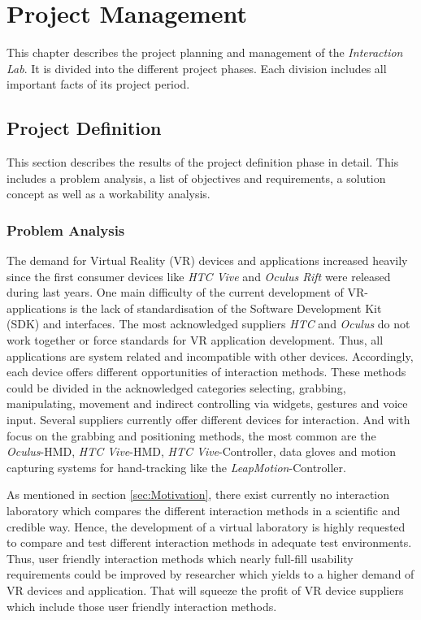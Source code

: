 \section{Project Management} \label{sec:pm}

This chapter describes the project planning and management of the \textit{Interaction Lab}. It is divided into the different project phases. Each division includes all important facts of its project period.

\subsection{Project Definition} \label{sec:PMProjectdefinition}
This section describes the results of the project definition phase in detail. This includes a problem analysis, a list of objectives and requirements, a solution concept as well as a workability analysis.

\subsubsection{Problem Analysis}\label{sec:PMProblemAnalysis}
The demand for Virtual Reality (VR) devices and applications increased heavily since the first consumer devices like \textit{HTC Vive} and \textit{Oculus Rift} were released during last years. One main difficulty of the current development of VR-applications is the lack of standardisation of the Software Development Kit (SDK) and interfaces. The most acknowledged suppliers \textit{HTC} and \textit{Oculus} do not work together or force standards for VR application development. Thus, all applications are system related and incompatible with other devices. Accordingly, each device offers different opportunities of interaction methods. These methods could be divided in the acknowledged categories selecting, grabbing, manipulating, movement and indirect controlling via widgets, gestures and voice input. Several suppliers currently offer different devices for interaction. And with focus on the grabbing and positioning methods, the most common are the \textit{Oculus}-HMD, \textit{HTC Vive}-HMD, \textit{HTC Vive}-Controller, data gloves and motion capturing systems for hand-tracking like the \textit{LeapMotion}-Controller.

As mentioned in section \ref{sec:Motivation}, there exist currently no interaction laboratory which compares the different interaction methods in a scientific and credible way. Hence, the development of a virtual laboratory is highly requested to compare and test different interaction methods in adequate test environments. Thus, user friendly interaction methods which nearly full-fill usability requirements could be improved by researcher which yields to a higher demand of VR devices and application. That will squeeze the profit of VR device suppliers which include those user friendly interaction methods. 

